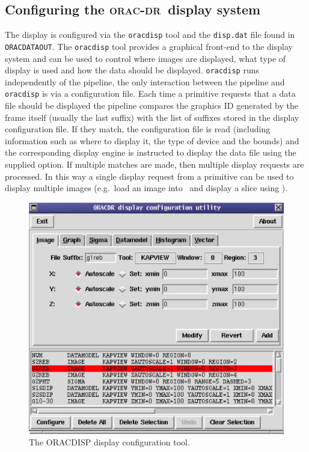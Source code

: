 \documentclass[twoside,11pt]{article}
\newcommand{\xref}[3]{#1}
\newcommand{\xlabel}[1]{}
\renewcommand{\_}{\texttt{\symbol{95}}}
\newcommand{\oracdr}{\xref{\textsc{orac-dr}}{sun230}{}}
\newcommand{\Kappa}{\xref{{\sc{Kappa}}}{sun95}{}}
\newcommand{\gaia}{\xref{{\sc{Gaia}}}{sun214}{}}
\begin{document}
\subsection{Configuring the \oracdr\ display system\xlabel{configuring_the_oracdr_display_system}}

The display is configured via the \texttt{oracdisp} tool and the 
\texttt{disp.dat} file found in \texttt{ORAC\_DATA\_OUT}. The \texttt{oracdisp}
tool provides a graphical front-end to the display system and
can be used to control where images are displayed, what type of display
is used and how the data should be displayed. \texttt{oracdisp}
runs independently of the pipeline, the only interaction between
the pipeline and \texttt{oracdisp} is via a configuration file.
Each time a primitive requests that a data file should be displayed
the pipeline compares the graphics ID generated by the frame itself (usually
the last suffix) with the list of suffixes stored in the display configuration 
file. If they match, the configuration file is read (including information
such as where to display it, the type of device and the bounds) and the
corresponding display engine is instructed to display the data file 
using the supplied option. If multiple matches are made, then multiple
display requests are processed. In this way a single display request
from a primitive can be used to display multiple images (e.g.\ load an image
into \gaia\ and display a slice using \Kappa).


\begin{figure}
\begin{center}
\includegraphics[width=\textwidth]{sun231_disp.eps}
\caption{The ORACDISP display configuration tool.}
\label{fig:oracdisp}
\end{center}
\end{figure}
\end{document}
